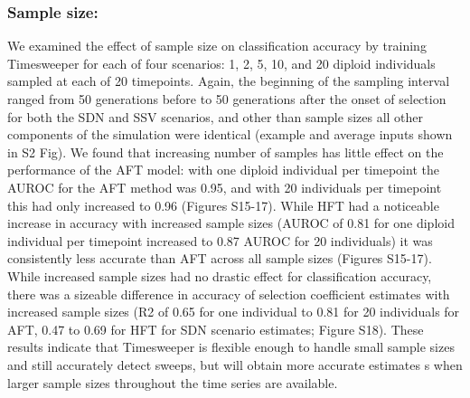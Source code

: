 \subsubsection{Sample size:} We examined the effect of sample size on classification accuracy by training Timesweeper for each of four scenarios: 1, 2, 5, 10, and 20 diploid individuals sampled at each of 20 timepoints. Again, the beginning of the sampling interval ranged from 50 generations before to 50 generations after the onset of selection for both the SDN and SSV scenarios, and other than sample sizes all other components of the simulation were identical (example and average inputs shown in S2 Fig). We found that increasing number of samples has little effect on the performance of the AFT model: with one diploid individual per timepoint the AUROC for the AFT method was 0.95, and with 20 individuals per timepoint this had only increased to 0.96 (Figures S15-17). While HFT had a noticeable increase in accuracy with increased sample sizes (AUROC of 0.81 for one diploid individual per timepoint increased to 0.87 AUROC for 20 individuals) it was consistently less accurate than AFT across all sample sizes (Figures S15-17).
While increased sample sizes had no drastic effect for classification accuracy, there was a sizeable difference in accuracy of selection coefficient estimates with increased sample sizes (R2 of 0.65 for one individual to 0.81 for 20 individuals for AFT, 0.47 to 0.69 for HFT for SDN scenario estimates; Figure S18). These results indicate that Timesweeper is flexible enough to handle small sample sizes and still accurately detect sweeps, but will obtain more accurate estimates s when larger sample sizes throughout the time series are available. \\

